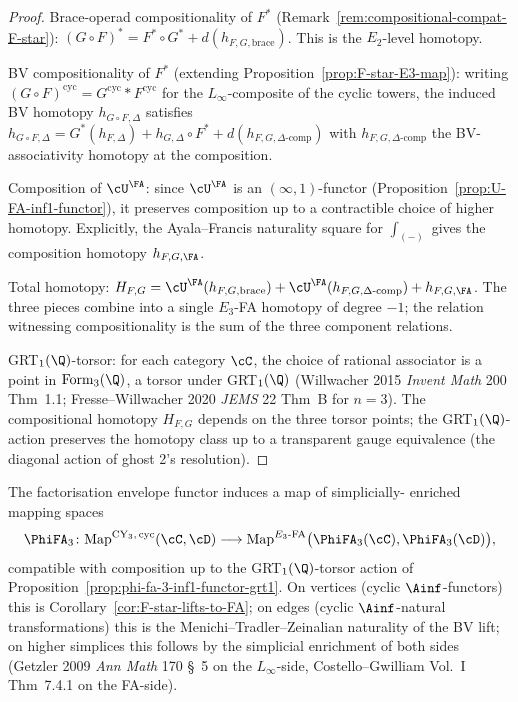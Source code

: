\begin{proof}
Brace-operad compositionality of $F^*$
(Remark~\ref{rem:compositional-compat-F-star}):
$(G \circ F)^* = F^* \circ G^* + d(h_{F,G,\mathrm{brace}})$.  This is
the $E_2$-level homotopy.

BV compositionality of $F^*$ (extending
Proposition~\ref{prop:F-star-E3-map}): writing
$(G \circ F)^{\mathrm{cyc}} = G^{\mathrm{cyc}} * F^{\mathrm{cyc}}$ for
the $L_\infty$-composite of the cyclic towers, the induced BV homotopy
$h_{G\circ F, \Delta}$ satisfies
$h_{G\circ F, \Delta} = G^*(h_{F,\Delta}) + h_{G,\Delta} \circ F^* +
d(h_{F,G,\Delta\text{-comp}})$
with $h_{F,G,\Delta\text{-comp}}$ the BV-associativity homotopy at the
composition.

Composition of $\cU^\FA$: since $\cU^\FA$ is an $(\infty,1)$-functor
(Proposition~\ref{prop:U-FA-inf1-functor}), it preserves composition up
to a contractible choice of higher homotopy.  Explicitly, the
Ayala--Francis naturality square for
$\int_{(-)}$ gives the composition homotopy $h_{F,G,\FA}$.

Total homotopy:
$H_{F,G} = \cU^\FA(h_{F,G,\mathrm{brace}}) +
\cU^\FA(h_{F,G,\Delta\text{-comp}}) + h_{F,G,\FA}$.
The three pieces combine into a single $E_3$-FA homotopy of degree
$-1$; the relation witnessing compositionality is the sum of the
three component relations.

GRT$_1(\Q)$-torsor: for each category $\cC$, the choice of rational
associator is a point in $\mathrm{Form}_3(\Q)$, a torsor under
GRT$_1(\Q)$ (Willwacher 2015 \emph{Invent Math} 200 Thm~1.1;
Fresse--Willwacher 2020 \emph{JEMS} 22 Thm~B for $n=3$).  The
compositional homotopy $H_{F,G}$ depends on the three torsor points;
the GRT$_1(\Q)$-action preserves the homotopy class up to a
transparent gauge equivalence (the diagonal action of ghost 2's
resolution).
\end{proof}

\begin{definition}
\label{defn:phi-fa-3-mapping-complex}
The factorisation envelope functor induces a map of simplicially-
enriched mapping spaces
\[
 \PhiFA_3
 \colon
 \mathrm{Map}^{\mathrm{CY}_3,\,\mathrm{cyc}}(\cC, \cD)
 \longrightarrow
 \mathrm{Map}^{E_3\text{-FA}}\bigl(\PhiFA_3(\cC), \PhiFA_3(\cD)\bigr),
\]
compatible with composition up to the GRT$_1(\Q)$-torsor action of
Proposition~\ref{prop:phi-fa-3-inf1-functor-grt1}.  On vertices
(cyclic $\Ainf$-functors) this is Corollary~\ref{cor:F-star-lifts-to-FA};
on edges (cyclic $\Ainf$-natural transformations) this is the
Menichi--Tradler--Zeinalian naturality of the BV lift; on higher
simplices this follows by the simplicial enrichment of both sides
(Getzler 2009 \emph{Ann Math} 170 \S~5 on the $L_\infty$-side,
Costello--Gwilliam Vol.~I Thm~7.4.1 on the FA-side).
\end{definition}

